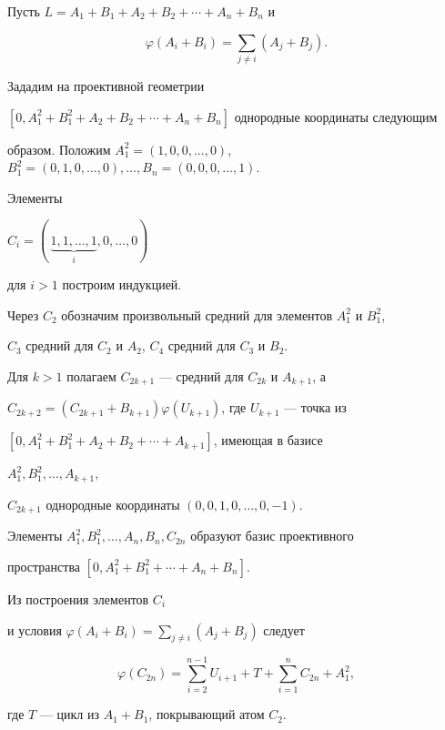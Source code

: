 \begin{pf}


Пусть $L=A_1+B_1+A_2+B_2+\dotsb+A_n+B_n$ и


$$


\varphi(A_i+B_i)=\sum_{j \ne i}(A_j+B_j).


$$


Зададим на проективной геометрии


$[0,A_1^2+B_1^2+A_2+B_2+\dotsb+A_n+B_n]$ однородные координаты следующим


образом. Положим $A_1^2


=(1,0,0,\dotsc,0)$, $B_1^2=(0,1,0,\dotsc,0),\dotsc, B_n=(0,0,0,\dotsc,1)$.


Элементы


$C_i=(\,\underbrace{ 1,1,\dotsc,1}_i,0,\dotsc,0)$


для $i>1$ построим индукцией.





Через $C_2$ обозначим произвольный средний для элементов $A_1^2$ и $B_1^2$,


$C_3$ средний для $C_2$ и $A_2$, $C_4$ средний для $C_3$ и $B_2$.


Для $k>1$ полагаем $C_{2k+1}$ --- средний для $C_{2k}$ и $A_{k+1}$, а


$C_{2k+2}=(C_{2k+1}+B_{k+1}) \varphi (U_{k+1})$, где $U_{k+1}$ --- точка из


$[0,A_1^2+B_1^2+A_2+B_2+\dotsb+A_{k+1}]$, имеющая в базисе


$A_1^2,B_1^2,\dotsc,A_{k+1},$


$C_{2k+1}$ однородные координаты $(0,0,1,0,\dotsc,0,-1)$.





Элементы $A_1^2,B_1^2,\dotsc,A_n,B_n,C_{2n}$ образуют базис проективного


пространства $[0,A_1^2+B_1^2+\dotsb+A_n+B_n]$.


Из построения элементов $C_i$


и условия $\varphi(A_i+B_i)=\sum \limits_{j \ne i}(A_j+B_j)$ следует


$$


\varphi(C_{2n}) =\sum_{i=2}^{n-1}U_{i+1}+T+\sum_{i=1}^n C_{2n}+A_1^2,


$$


где $T$ --- цикл из $A_1+B_1$, покрывающий атом $C_2$.






\end{pf}
